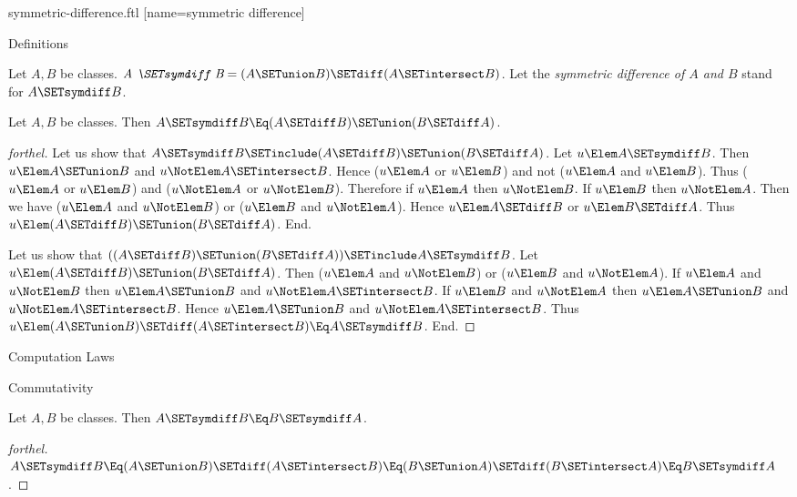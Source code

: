 \documentclass{stex}
\begin{document}
\begin{smodule}{symmetric-difference.ftl}
[name=symmetric difference]{\,\triangle\,}

\begin{sfragment}{Definitions}
  \begin{definition}[forthel,for=symmetric difference]
    Let $A, B$ be classes.
    $\emph{A \SETsymdiff B} = (A \SETunion B) \SETdiff (A \SETintersect B)$.
    Let the \emph{symmetric difference of $A$ and $B$} stand for $A \SETsymdiff B$.
  \end{definition}

  \begin{proposition}[forthel]
    Let $A, B$ be classes.
    Then $A \SETsymdiff B \Eq (A \SETdiff B) \SETunion (B \SETdiff A)$.
  \end{proposition}
  \begin{proof}[forthel]
    Let us show that $A \SETsymdiff B \SETinclude (A \SETdiff B) \SETunion (B \SETdiff A)$.
      Let $u \Elem A \SETsymdiff B$.
      Then $u \Elem A \SETunion B$ and $u \NotElem A \SETintersect B$.
      Hence ($u \Elem A$ or $u \Elem B$) and not ($u \Elem A$ and $u \Elem B$).
      Thus ($u \Elem A$ or $u \Elem B$) and ($u \NotElem A$ or $u \NotElem B$).
      Therefore if $u \Elem A$ then $u \NotElem B$.
      If $u \Elem B$ then $u \NotElem A$.
      Then we have ($u \Elem A$ and $u \NotElem B$) or ($u \Elem B$ and $u \NotElem A$).
      Hence $u \Elem A \SETdiff B$ or $u \Elem B \SETdiff A$.
      Thus $u \Elem (A \SETdiff B) \SETunion (B \SETdiff A)$.
    End.

    Let us show that $((A \SETdiff B) \SETunion (B \SETdiff A)) \SETinclude A \SETsymdiff B$. %
      Let $u \Elem (A \SETdiff B) \SETunion (B \SETdiff A)$.
      Then ($u \Elem A$ and $u \NotElem B$) or ($u \Elem B$ and $u \NotElem A$).
      If $u \Elem A$ and $u \NotElem B$ then $u \Elem A \SETunion B$ and $u \NotElem A \SETintersect B$.
      If $u \Elem B$ and $u \NotElem A$ then $u \Elem A \SETunion B$ and $u \NotElem A \SETintersect B$.
      Hence $u \Elem A \SETunion B$ and $u \NotElem A \SETintersect B$.
      Thus $u \Elem (A \SETunion B) \SETdiff (A \SETintersect B) \Eq A \SETsymdiff B$.
    End.
  \end{proof}
\end{sfragment}

\begin{sfragment}{Computation Laws}
  \begin{sfragment}{Commutativity}
    \begin{proposition}[forthel]
      Let $A, B$ be classes.
      Then $A \SETsymdiff B \Eq B \SETsymdiff A$.
    \end{proposition}
    \begin{proof}[forthel]
      $A \SETsymdiff B
        \Eq (A \SETunion B) \SETdiff (A \SETintersect B)
        \Eq (B \SETunion A) \SETdiff (B \SETintersect A)
        \Eq B \SETsymdiff A$.
    \end{proof}
  \end{sfragment}


\end{sfragment}
\end{smodule}
\end{document}
